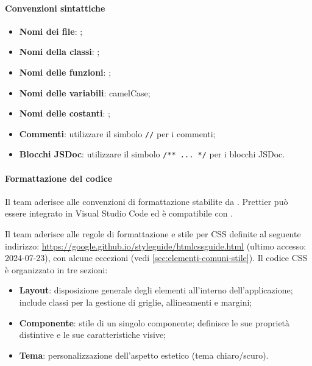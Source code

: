 \paragraph*{Convenzioni sintattiche}
\begin{itemize}
  \item \textbf{Nomi dei file}: ;
  \item \textbf{Nomi della classi}: ;
  \item \textbf{Nomi delle funzioni}: ;
  \item \textbf{Nomi delle variabili}: camelCase;
  \item \textbf{Nomi delle costanti}: ;
  \item \textbf{Commenti}: utilizzare il simbolo \verb|//| per i commenti;
  \item \textbf{Blocchi JSDoc}: utilizzare il simbolo \verb|/** ... */| per i blocchi JSDoc.
\end{itemize}

\paragraph*{Formattazione del codice}
\par Il team aderisce alle convenzioni di formattazione stabilite da . Prettier può essere integrato in Visual Studio Code ed è compatibile con .

\par Il team aderisce alle regole di formattazione e stile per CSS definite al seguente indirizzo: \href{https://google.github.io/styleguide/htmlcssguide.html}{https://google.github.io/styleguide/htmlcssguide.html} (ultimo accesso: 2024-07-23), con alcune eccezioni (vedi \ref{sec:elementi-comuni-stile}). Il codice CSS è organizzato in tre sezioni:
\begin{itemize}
  \item \textbf{Layout}: disposizione generale degli elementi all'interno dell'applicazione; include classi per la gestione di griglie, allineamenti e margini;
  \item \textbf{Componente}: stile di un singolo componente; definisce le sue proprietà distintive e le sue caratteristiche visive;
  \item \textbf{Tema}: personalizzazione dell'aspetto estetico (tema chiaro/scuro).
\end{itemize}


